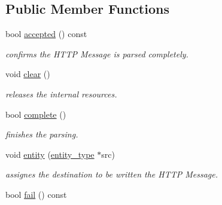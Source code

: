 \subsection*{Public Member Functions}
\begin{DoxyCompactItemize}
\item 
\hypertarget{classhryky_1_1http_1_1_parser_ae057f354fe8aaf599f211b4627401b76}{bool \hyperlink{classhryky_1_1http_1_1_parser_ae057f354fe8aaf599f211b4627401b76}{accepted} () const }\label{classhryky_1_1http_1_1_parser_ae057f354fe8aaf599f211b4627401b76}

\begin{DoxyCompactList}\small\item\em confirms the H\-T\-T\-P Message is parsed completely. \end{DoxyCompactList}\item 
\hypertarget{classhryky_1_1http_1_1_parser_ae2037db169e79eaf82f809f7e8b7663f}{void \hyperlink{classhryky_1_1http_1_1_parser_ae2037db169e79eaf82f809f7e8b7663f}{clear} ()}\label{classhryky_1_1http_1_1_parser_ae2037db169e79eaf82f809f7e8b7663f}

\begin{DoxyCompactList}\small\item\em releases the internal resources. \end{DoxyCompactList}\item 
\hypertarget{classhryky_1_1http_1_1_parser_adcb287154ee080e374279718741ce42b}{bool \hyperlink{classhryky_1_1http_1_1_parser_adcb287154ee080e374279718741ce42b}{complete} ()}\label{classhryky_1_1http_1_1_parser_adcb287154ee080e374279718741ce42b}

\begin{DoxyCompactList}\small\item\em finishes the parsing. \end{DoxyCompactList}\item 
\hypertarget{classhryky_1_1http_1_1_parser_ac1a446bef85406d069efe5f692f0cfcc}{void \hyperlink{classhryky_1_1http_1_1_parser_ac1a446bef85406d069efe5f692f0cfcc}{entity} (\hyperlink{classhryky_1_1http_1_1_entity}{entity\-\_\-type} $\ast$src)}\label{classhryky_1_1http_1_1_parser_ac1a446bef85406d069efe5f692f0cfcc}

\begin{DoxyCompactList}\small\item\em assignes the destination to be written the H\-T\-T\-P Message. \end{DoxyCompactList}\item 
\hypertarget{classhryky_1_1http_1_1_parser_a549242d05cb51d4b88354ab9892f56ec}{bool \hyperlink{classhryky_1_1http_1_1_parser_a549242d05cb51d4b88354ab9892f56ec}{fail} () const }\label{classhryky_1_1http_1_1_parser_a549242d05cb51d4b88354ab9892f56ec}


\end{DoxyCompactItemize}

